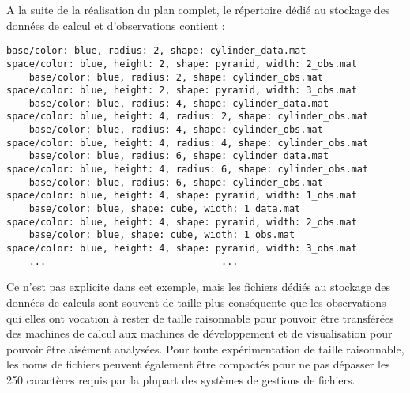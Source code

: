 A la suite de la réalisation du plan complet, le répertoire dédié au stockage des données de calcul et d'observations contient : \\
\begin{Verbatim}[fontsize=\scriptsize]
	base/color: blue, radius: 2, shape: cylinder_data.mat            space/color: blue, height: 2, shape: pyramid, width: 2_obs.mat
	base/color: blue, radius: 2, shape: cylinder_obs.mat             space/color: blue, height: 2, shape: pyramid, width: 3_obs.mat
	base/color: blue, radius: 4, shape: cylinder_data.mat            space/color: blue, height: 4, radius: 2, shape: cylinder_obs.mat
	base/color: blue, radius: 4, shape: cylinder_obs.mat             space/color: blue, height: 4, radius: 4, shape: cylinder_obs.mat
	base/color: blue, radius: 6, shape: cylinder_data.mat            space/color: blue, height: 4, radius: 6, shape: cylinder_obs.mat
	base/color: blue, radius: 6, shape: cylinder_obs.mat             space/color: blue, height: 4, shape: pyramid, width: 1_obs.mat
	base/color: blue, shape: cube, width: 1_data.mat                 space/color: blue, height: 4, shape: pyramid, width: 2_obs.mat
	base/color: blue, shape: cube, width: 1_obs.mat                  space/color: blue, height: 4, shape: pyramid, width: 3_obs.mat
	...							      ...
\end{Verbatim}

Ce n'est pas explicite dans cet exemple, mais les fichiers  dédiés au stockage des données de calculs sont souvent de taille plus conséquente que les observations qui elles ont vocation à rester de taille raisonnable pour pouvoir être transférées des machines de calcul aux machines de développement et de visualisation pour pouvoir être aisément analysées. Pour toute expérimentation de taille raisonnable, les noms de fichiers peuvent également être compactés pour ne pas dépasser les 250 caractères requis par la plupart des systèmes de gestions de fichiers.

